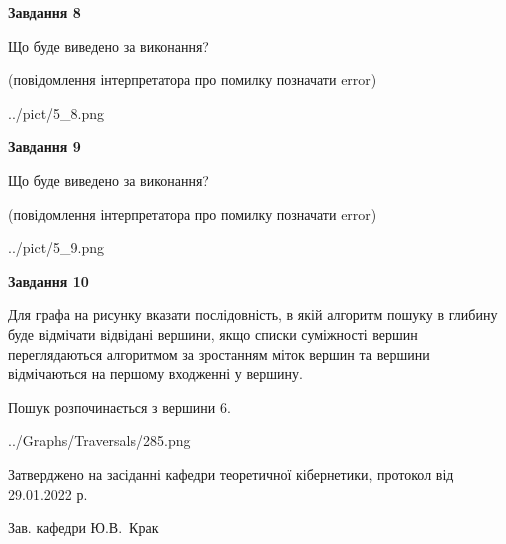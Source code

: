 \documentclass[12pt, ukrainian]{article}
\begin{document}
{\begin {large}
{\begin {center}\textbf{Завдання 8}\end {center}}\par
Що буде виведено за виконання?\par
 (повідомлення інтерпретатора про помилку позначати error)\par
\begin{center}
	{../pict/5_8.png}
\end{center}
\newpage

{\begin {center}\textbf{Завдання 9}\end {center}}\par
Що буде виведено за виконання?\par
 (повідомлення інтерпретатора про помилку позначати error)\par
\begin{center}
	{../pict/5_9.png}
\end{center}
\newpage

{\begin {center}\textbf{Завдання 10}\end {center}}\par
Для графа на рисунку вказати послідовність, в якій алгоритм пошуку в глибину буде відмічати відвідані вершини, якщо списки суміжності вершин переглядаються алгоритмом за зростанням міток вершин та вершини відмічаються на першому вход\-женні у вершину.\par
Пошук розпочинається з вершини 6.\par

\begin{center}
	{../Graphs/Traversals/285.png}
\end{center}\par
\newpage


\end {large}
}
{\smallskip \begin {small} Затверджено на засіданні кафедри теоретичної кібернетики, протокол  від   29.01.2022 р.\par\smallskip\smallskip
{\parbox {6.5 cm}{Зав. кафедри \dotfill Ю.В.~Крак}} \end{small}}
\end{document}
